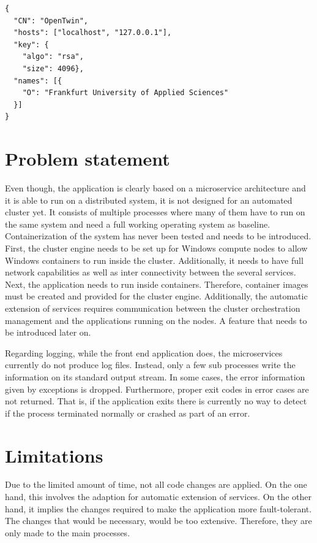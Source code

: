 \begin{lstlisting}[label=lst:background.ca-csr, caption={Example of meta data in form of \ac{CSR} configuration. "CN" is the certificate name. "hosts" describes the accepted hostnames, "key" describes information about the cryptography algorithm, "names" contains meta data of the organization}]
{
  "CN": "OpenTwin",
  "hosts": ["localhost", "127.0.0.1"],
  "key": {
    "algo": "rsa",
    "size": 4096},
  "names": [{
    "O": "Frankfurt University of Applied Sciences"
  }]
}
\end{lstlisting}


\section{Problem statement}
Even though, the application is clearly based on a microservice architecture and it is able to run on a distributed system, it is not designed for an automated cluster yet.
It consists of multiple processes where many of them have to run on the same system and need a full working operating system as baseline.  %
Containerization of the system has never been tested and needs to be introduced. 
First, the cluster engine needs to be set up for \ac{Windows} compute nodes to allow \ac{Windows} containers to run inside the cluster. Additionally, it needs to have full network capabilities as well as inter connectivity between the several services.
Next, the application needs to run inside containers. Therefore, container images must be created and provided for the cluster engine. 
Additionally, the automatic extension of services requires communication between the cluster orchestration management and the applications running on the nodes. A feature that needs to be introduced later on.

Regarding logging, while the front end application does, the microservices currently do not produce log files. Instead, only a few sub processes write the information on its standard output stream. In some cases, the error information given by exceptions is dropped.
Furthermore, proper exit codes in error cases are not returned. That is, if the application exits there is currently no way to detect if the process terminated normally or crashed as part of an error.

\section{Limitations}
Due to the limited amount of time, not all code changes are applied. On the one hand, this involves the adaption for automatic extension of services. On the other hand, it implies the changes required to make the application more fault-tolerant. The changes that would be necessary, would be too extensive. Therefore, they are only made to the main processes.

